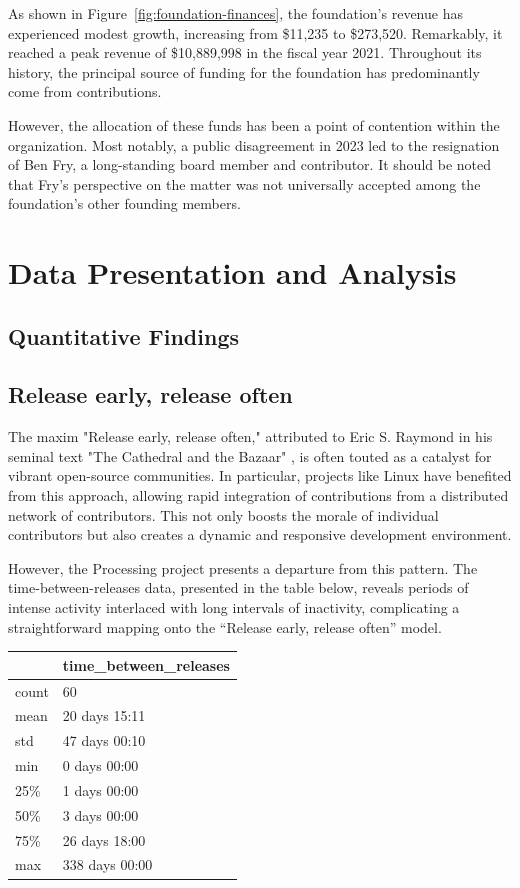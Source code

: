 \documentclass{article}
\begin{document}
As shown in Figure~\ref{fig:foundation-finances}, the foundation's revenue has experienced modest growth, increasing from \$11,235 to \$273,520. Remarkably, it reached a peak revenue of \$10,889,998 in the fiscal year 2021. Throughout its history, the principal source of funding for the foundation has predominantly come from contributions. 

However, the allocation of these funds has been a point of contention within the organization. Most notably, a public disagreement in 2023 led to the resignation of Ben Fry, a long-standing board member and contributor. It should be noted that Fry's perspective on the matter was not universally accepted among the foundation's other founding members. \parencite{benfry[@ben_fry]HaveMadeExtremely2023} \parencite{caseyreas[@reas]EarlierThisWeek2023} \parencite{danielshiffman[@shiffman]WouldPostNote2023}

\section{Data Presentation and Analysis}

\subsection{Quantitative Findings}

\subsection{Release early, release often}

The maxim "Release early, release often," attributed to Eric S. Raymond in his seminal text "The Cathedral and the Bazaar" \parencite{raymondCathedralBazaar1999}, is often touted as a catalyst for vibrant open-source communities. In particular, projects like Linux have benefited from this approach, allowing rapid integration of contributions from a distributed network of contributors. This not only boosts the morale of individual contributors but also creates a dynamic and responsive development environment.

However, the Processing project presents a departure from this pattern. The time-between-releases data, presented in the table below, reveals periods of intense activity interlaced with long intervals of inactivity, complicating a straightforward mapping onto the “Release early, release often” model.

\begin{tabular}{ll}
  \toprule
   & time\_between\_releases \\
  \midrule
  count & 60 \\
  mean & 20 days 15:11 \\
  std & 47 days 00:10 \\
  min & 0 days 00:00 \\
  25\% & 1 days 00:00 \\
  50\% & 3 days 00:00 \\
  75\% & 26 days 18:00 \\
  max & 338 days 00:00 \\
  \bottomrule
\end{tabular}
\end{document}
